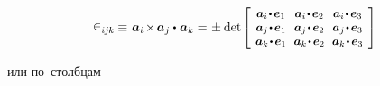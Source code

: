 \begin{otherlanguage}{russian}
\nopagebreak\vspace{-0.2em}\begin{equation*}
\levicivita_{i\hspace{-0.1ex}j\hspace{-0.1ex}k} \hspace{-0.1ex}
\equiv \hspace{.16ex} \bm{a}_i \hspace{-0.25ex} \times \hspace{-0.25ex} \bm{a}_j \dotp \hspace{.1ex} \bm{a}_k =
\hspace{.1ex} \pm \hspace{.1ex} \operatorname{det}\hspace{-0.1ex}
\scalebox{0.92}[0.92]{$\left[\hspace{-0.2ex}\begin{array}{c@{\hspace{.64em}}c@{\hspace{.64em}}c}
\bm{a}_i \narrowdotp\hspace{.12ex} \bm{e}_1 & \bm{a}_i \narrowdotp\hspace{.12ex} \bm{e}_2 & \bm{a}_i \narrowdotp\hspace{.12ex} \bm{e}_3 \\
\bm{a}_j \narrowdotp\hspace{.12ex} \bm{e}_1 & \bm{a}_j \narrowdotp\hspace{.12ex} \bm{e}_2 & \bm{a}_j \narrowdotp\hspace{.12ex} \bm{e}_3 \\
\bm{a}_k \narrowdotp\hspace{.12ex} \bm{e}_1 & \bm{a}_k \narrowdotp\hspace{.12ex} \bm{e}_2 & \bm{a}_k \narrowdotp\hspace{.12ex} \bm{e}_3
\end{array}\hspace{-0.12ex}\right]$}
\end{equation*}

\vspace{-0.2em}\noindent
или по~столбцам


\end{otherlanguage}
